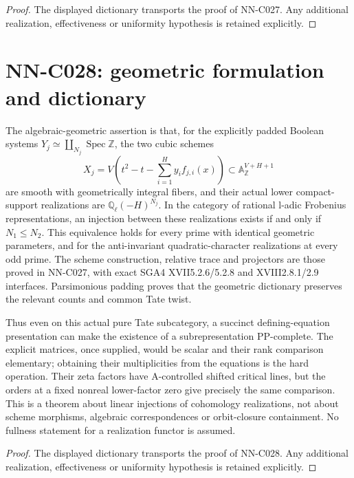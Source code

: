\begin{proof} The displayed dictionary transports the proof of NN-C027. Any additional realization, effectiveness or uniformity hypothesis is retained explicitly.\end{proof}


\section{NN-C028: geometric formulation and dictionary}
\begin{geometricstatement}[NN-C028]
The algebraic-geometric assertion is that, for the explicitly padded Boolean systems $Y_j\simeq\coprod_{N_j}\operatorname{Spec}\mathbb Z$, the two cubic schemes
\[
 X_j=V\left(t^2-t-\sum_{i=1}^H y_i f_{j,i}(x)\right)
          \subset\mathbb A^{V+H+1}_\mathbb Z
\]
are smooth with geometrically integral fibers, and their actual lower compact-support realizations are $\mathbb Q_\ell(-H)^{N_j}$. In the category of rational l-adic Frobenius representations, an injection between these realizations exists if and only if $N_1\leq N_2$. This equivalence holds for every prime with identical geometric parameters, and for the anti-invariant quadratic-character realizations at every odd prime. The scheme construction, relative trace and projectors are those proved in NN-C027, with exact SGA4 XVII5.2.6/5.2.8 and XVIII2.8.1/2.9 interfaces. Parsimonious padding proves that the geometric dictionary preserves the relevant counts and common Tate twist.

Thus even on this actual pure Tate subcategory, a succinct defining-equation presentation can make the existence of a subrepresentation PP-complete. The explicit matrices, once supplied, would be scalar and their rank comparison elementary; obtaining their multiplicities from the equations is the hard operation. Their zeta factors have A-controlled shifted critical lines, but the orders at a fixed nonreal lower-factor zero give precisely the same comparison. This is a theorem about linear injections of cohomology realizations, not about scheme morphisms, algebraic correspondences or orbit-closure containment. No fullness statement for a realization functor is assumed.
\end{geometricstatement}
\begin{proof} The displayed dictionary transports the proof of NN-C028. Any additional realization, effectiveness or uniformity hypothesis is retained explicitly.\end{proof}


